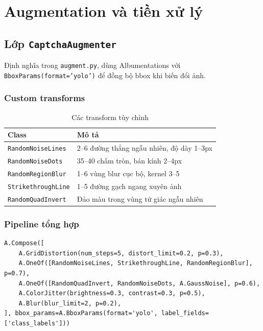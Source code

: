 \documentclass[a4paper,12pt]{report}
\begin{document}
\chapter{Augmentation và tiền xử lý}

\section{Lớp \texttt{CaptchaAugmenter}}
Định nghĩa trong \texttt{augment.py}, dùng Albumentations với \texttt{BboxParams(format='yolo')} để đồng bộ bbox khi biến đổi ảnh.

\subsection{Custom transforms}
\begin{table}[H]
  \centering
  \caption{Các transform tùy chỉnh}
  \begin{tabular}{p{3.5cm}p{9.5cm}}
    \toprule
    \textbf{Class} & \textbf{Mô tả} \\
    \midrule
    \texttt{RandomNoiseLines} & 2--6 đường thẳng ngẫu nhiên, độ dày 1--3px \\
    \texttt{RandomNoiseDots} & 35--40 chấm tròn, bán kính 2--4px \\
    \texttt{RandomRegionBlur} & 1--6 vùng blur cục bộ, kernel 3--5 \\
    \texttt{StrikethroughLine} & 1--5 đường gạch ngang xuyên ảnh \\
    \texttt{RandomQuadInvert} & Đảo màu trong vùng tứ giác ngẫu nhiên \\
    \bottomrule
  \end{tabular}
\end{table}

\subsection{Pipeline tổng hợp}
\begin{lstlisting}
A.Compose([
    A.GridDistortion(num_steps=5, distort_limit=0.2, p=0.3),
    A.OneOf([RandomNoiseLines, StrikethroughLine, RandomRegionBlur], p=0.7),
    A.OneOf([RandomQuadInvert, RandomNoiseDots, A.GaussNoise], p=0.6),
    A.ColorJitter(brightness=0.3, contrast=0.3, p=0.5),
    A.Blur(blur_limit=2, p=0.2),
], bbox_params=A.BboxParams(format='yolo', label_fields=['class_labels']))
\end{lstlisting}
\end{document}
